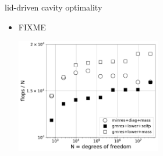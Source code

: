 \documentclass[10pt,hyperref,dvipsnames]{beamer}
\begin{document}
\begin{frame}{lid-driven cavity optimality}

\begin{itemize}
\item FIXME
\begin{center}
\includegraphics[width=0.5\textwidth]{figs/stokesopt-work.pdf}
\end{center}
\end{itemize}
\end{frame}
\end{document}
